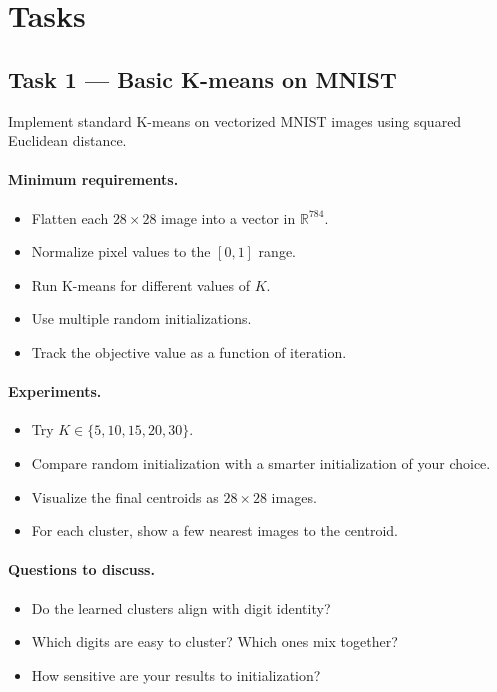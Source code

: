 \documentclass[11pt]{article}
\begin{document}
\section*{Tasks}

\subsection*{Task 1 --- Basic K-means on MNIST}

Implement standard K-means on vectorized MNIST images using squared Euclidean distance.

\paragraph{Minimum requirements.}
\begin{itemize}[itemsep=2pt]
    \item Flatten each \(28 \times 28\) image into a vector in \(\mathbb{R}^{784}\).
    \item Normalize pixel values to the $[0,1]$ range.
    \item Run K-means for different values of \(K\).
    \item Use multiple random initializations.
    \item Track the objective value as a function of iteration.
\end{itemize}

\paragraph{Experiments.}
\begin{itemize}[itemsep=2pt]
    \item Try \(K \in \{5, 10, 15, 20, 30\}\).
    \item Compare random initialization with a smarter initialization of your choice.
    \item Visualize the final centroids as \(28 \times 28\) images.
    \item For each cluster, show a few nearest images to the centroid.
\end{itemize}

\paragraph{Questions to discuss.}
\begin{itemize}[itemsep=2pt]
    \item Do the learned clusters align with digit identity?
    \item Which digits are easy to cluster? Which ones mix together?
    \item How sensitive are your results to initialization?
\end{itemize}
\end{document}
